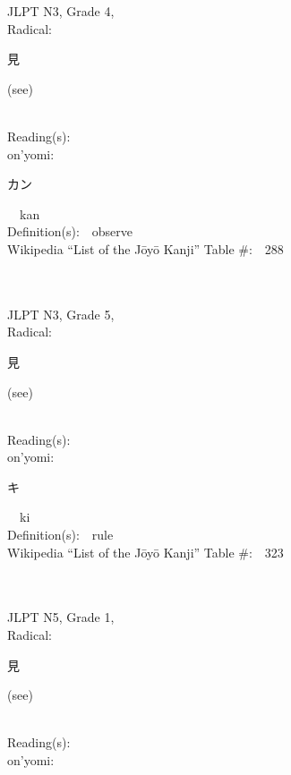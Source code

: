 \begin{multicols}{2}
{JLPT N3, Grade 4, \\Radical:\ \ {\begin{CJK}{UTF8}{min} 見 \end{CJK}} (see) } \\
Reading(s):\ \ \\
{\hspace*{1em}}on'yomi:\ \ \\
{\hspace*{2em}}{\begin{CJK}{UTF8}{min} カン \end{CJK}}\ \ kan\ \ \\
Definition(s):\ \ observe \\
Wikipedia ``List of the J\=oy\=o Kanji'' Table \#:\ \ 288 \\
\ \ \\
{\fontsize{34pt}{40pt}  }\ \ \\  %
{JLPT N3, Grade 5, \\Radical:\ \ {\begin{CJK}{UTF8}{min} 見 \end{CJK}} (see) } \\
Reading(s):\ \ \\
{\hspace*{1em}}on'yomi:\ \ \\
{\hspace*{2em}}{\begin{CJK}{UTF8}{min} キ \end{CJK}}\ \ ki\ \ \\
Definition(s):\ \ rule \\
Wikipedia ``List of the J\=oy\=o Kanji'' Table \#:\ \ 323 \\
\ \ \\
{\fontsize{34pt}{40pt}  }\ \ \\  %
{JLPT N5, Grade 1, \\Radical:\ \ {\begin{CJK}{UTF8}{min} 見 \end{CJK}} (see) } \\
Reading(s):\ \ \\
{\hspace*{1em}}on'yomi:\ \ \\

\end{multicols}
